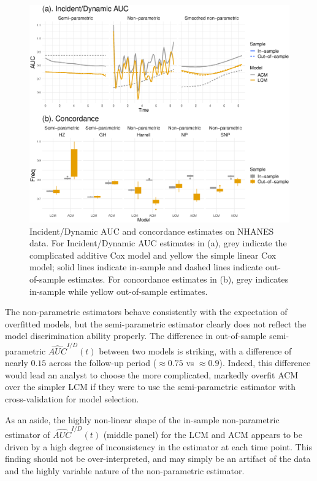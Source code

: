 \documentclass[useAMS,usenatbib, referee]{biom}
\begin{document}
\begin{figure}
    \centerline{\includegraphics[width=\textwidth]{appl.eps}}
    \caption{Incident/Dynamic AUC and concordance estimates on NHANES data. For Incident/Dynamic AUC estimates in (a), grey indicate the complicated additive Cox model and yellow the simple linear Cox model; solid lines indicate in-sample and dashed lines indicate out-of-sample estimates. For concordance estimates in (b), grey indicates in-sample while yellow out-of-sample estimates.}
    \label{fig:appl}
\end{figure}

The non-parametric estimators behave consistently with the expectation of overfitted models, but the semi-parametric estimator clearly does not reflect the model discrimination ability properly. The difference in out-of-sample semi-parametric $\hat{AUC}^{I/D}(t)$ between two models is striking, with a difference of nearly $0.15$ across the follow-up period ($\approx 0.75$ vs $\approx 0.9$). Indeed, this difference would lead an analyst to choose the more complicated, markedly overfit ACM over the simpler LCM if they were to use the semi-parametric estimator with cross-validation for model selection. 

As an aside, the highly non-linear shape of the in-sample non-parametric estimator of $\hat{AUC}^{I/D}(t)$ (middle panel) for the LCM and ACM appears to be driven by a high degree of inconsistency in the estimator at each time point. This finding should not be over-interpreted, and may simply be an artifact of the data and the highly variable nature of the non-parametric estimator. 
\end{document}
